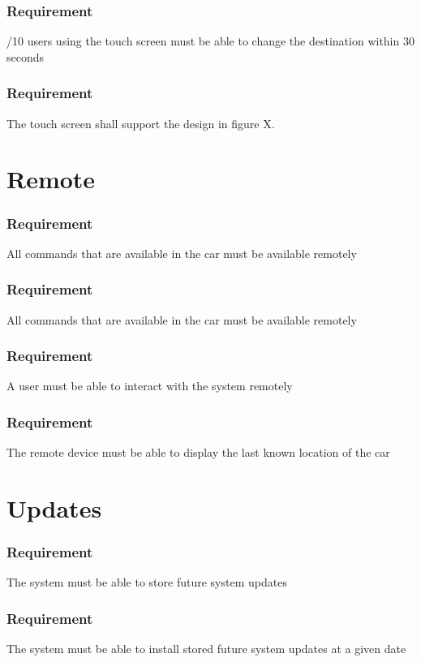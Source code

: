 \documentclass{article}
\begin{document}
{      \subsubsection{Requirement}
\hfill \break 
\- \- /10 users using the touch screen must be able to change the destination within 30 seconds
      \subsubsection{Requirement}
\hfill \break 
\- \- \-The touch screen shall support the design in figure X.


\section{Remote}
    \subsubsection{Requirement}
\hfill \break 
\- \- \-All commands that are available in the car must be available remotely
    \subsubsection{Requirement}
\hfill \break 
\- \- \-All commands that are available in the car must be available remotely
    \subsubsection{Requirement}
\hfill \break 
\- \- \-A user must be able to interact with the system remotely
    \subsubsection{Requirement}
\hfill \break 
\- \- \-The remote device must be able to display the last known location of the car

\section{Updates}
    \subsubsection{Requirement}
\hfill \break 
\- \- \-The system must be able to store future system updates
    \subsubsection{Requirement}
\hfill \break 
\- \- \-The system must be able to install stored future system updates at a given date
}
\end{document}
